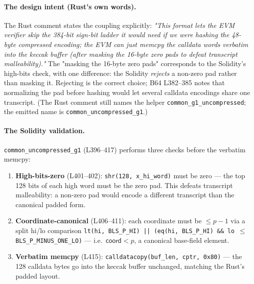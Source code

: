 \paragraph{The design intent (Rust's own words).} The Rust comment
states the coupling explicitly: \emph{"This format lets the EVM
verifier skip the 384-bit sign-bit ladder it would need if we were
hashing the 48-byte compressed encoding; the EVM can just memcpy
the calldata words verbatim into the keccak buffer (after masking
the 16-byte zero pads to defeat transcript malleability)."} The
"masking the 16-byte zero pads" corresponds to the Solidity's
high-bits check, with one difference: the Solidity \emph{rejects} a
non-zero pad rather than masking it. Rejecting is the correct
choice; B64 L382--385 notes that normalizing the pad before hashing
would let several calldata encodings share one transcript. (The Rust
comment still names the helper \texttt{common\_\allowbreak{}g1\_\allowbreak{}uncompressed};
the emitted name is \texttt{common\_\allowbreak{}uncompressed\_\allowbreak{}g1}.)

\paragraph{The Solidity validation.} \texttt{common\_\allowbreak{}uncompressed\_\allowbreak{}g1}
(L396--417) performs three checks before the verbatim memcpy:
\begin{enumerate}[leftmargin=1.5em,itemsep=1pt]
  \item \textbf{High-bits-zero} (L401--402):
        \texttt{shr(128, x\_\allowbreak{}hi\_\allowbreak{}word)} must be zero --- the top 128
        bits of each high word must be the zero pad. This defeats
        transcript malleability: a non-zero pad would encode a
        different transcript than the canonical padded form.
  \item \textbf{Coordinate-canonical} (L406--411): each coordinate
        must be $\le p-1$ via a split hi/lo comparison
        \texttt{lt(hi, BLS\_\allowbreak{}P\_\allowbreak{}HI) || (eq(hi, BLS\_\allowbreak{}P\_\allowbreak{}HI) \&\& lo
        $\le$ BLS\_\allowbreak{}P\_\allowbreak{}MINUS\_\allowbreak{}ONE\_\allowbreak{}LO)} --- i.e.\ $\mathsf{coord} < p$,
        a canonical base-field element.
  \item \textbf{Verbatim memcpy} (L415):
        \texttt{calldatacopy(buf\_\allowbreak{}len, cptr, 0x80)} --- the 128
        calldata bytes go into the keccak buffer unchanged, matching
        the Rust's padded layout.
\end{enumerate}

